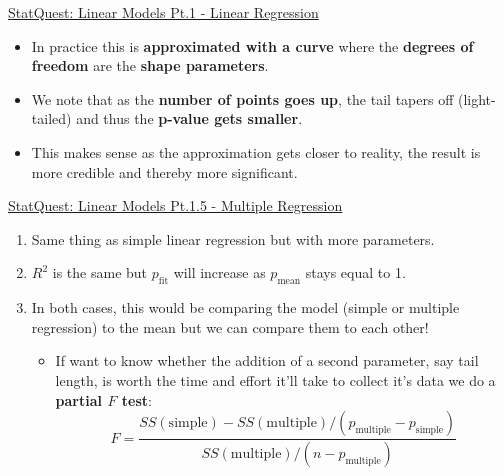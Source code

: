 \documentclass[12pt, titlepage, french]{report}
\begin{document}
\begin{YTB_SUMM}{\href{https://www.youtube.com/watch?v=nk2CQITm_eo&list=PLblh5JKOoLUIzaEkCLIUxQFjPIlapw8nU&index=2}{StatQuest: Linear Models Pt.1 - Linear Regression}}
\begin{enumerate}
\begin{itemize}
		\item	In practice this is \textbf{approximated with a curve} where the \textbf{degrees of freedom} are the \textbf{shape parameters}.
		\item	We note that as the \textbf{number of points goes up}, the tail tapers off (light-tailed) and thus the \textbf{p-value gets smaller}.
		\item	This makes sense as the approximation gets closer to reality, the result is more credible and thereby more significant.
	\end{itemize}	
\end{enumerate}
\end{YTB_SUMM}

\begin{YTB_SUMM}{\href{https://www.youtube.com/watch?v=zITIFTsivN8&list=PLblh5JKOoLUIzaEkCLIUxQFjPIlapw8nU&index=5}{StatQuest: Linear Models Pt.1.5 - Multiple Regression}}
	\begin{enumerate}
		\item	Same thing as simple linear regression but with more parameters.
		\item	$R^{2}$ is the same but $p_{\text{fit}}$ will increase as $p_{\text{mean}}$ stays equal to 1.
		\item	In both cases, this would be comparing the model (simple or multiple regression) to the mean but we can compare them to each other!
		\begin{itemize}
			\item	If want to know whether the addition of a second parameter, say tail length, is worth the time and effort it'll take to collect it's data we do a \textbf{partial $F$ test}:
			\begin{equation*}
				F	=	\frac{SS(\text{simple}) - SS(\text{multiple})/\left(   p_{\text{multiple}} - p_{\text{simple}} \right)}{SS(\text{multiple}) / \left( n - p_{\text{multiple}}\right)}
			\end{equation*}
		\end{itemize}
	\end{enumerate}
\end{YTB_SUMM}
\end{document}
